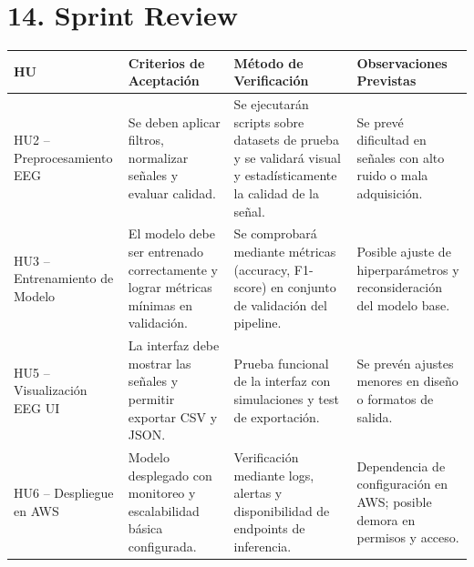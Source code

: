 \documentclass[
11pt, %
]{charter}
\begin{document}
\section{14. Sprint Review}
\label{sec:sprint_review}

\renewcommand{\arraystretch}{1.5}
\begin{table}[H]
\centering
\begin{tabularx}{\linewidth}{|>{\raggedright\arraybackslash}p{3.2cm}|
                                >{\raggedright\arraybackslash}p{3.2cm}|
                                >{\raggedright\arraybackslash}X|
                                >{\raggedright\arraybackslash}p{3.2cm}|}
\hline
\rowcolor[HTML]{C0C0C0}
\textbf{HU} & \textbf{Criterios de Aceptación} & \textbf{Método de Verificación} & \textbf{Observaciones Previstas} \\ \hline

HU2 – Preprocesamiento EEG &
Se deben aplicar filtros, normalizar señales y evaluar calidad. &
Se ejecutarán scripts sobre datasets de prueba y se validará visual y estadísticamente la calidad de la señal. &
Se prevé dificultad en señales con alto ruido o mala adquisición. \\ \hline

HU3 – Entrenamiento de Modelo &
El modelo debe ser entrenado correctamente y lograr métricas mínimas en validación. &
Se comprobará mediante métricas (accuracy, F1-score) en conjunto de validación del pipeline. &
Posible ajuste de hiperparámetros y reconsideración del modelo base. \\ \hline

HU5 – Visualización EEG UI &
La interfaz debe mostrar las señales y permitir exportar CSV y JSON. &
Prueba funcional de la interfaz con simulaciones y test de exportación. &
Se prevén ajustes menores en diseño o formatos de salida. \\ \hline

HU6 – Despliegue en AWS &
Modelo desplegado con monitoreo y escalabilidad básica configurada. &
Verificación mediante logs, alertas y disponibilidad de endpoints de inferencia. &
Dependencia de configuración en AWS; posible demora en permisos y acceso. \\ \hline

\end{tabularx}
\end{table}
\vspace{0.5cm}
\end{document}
